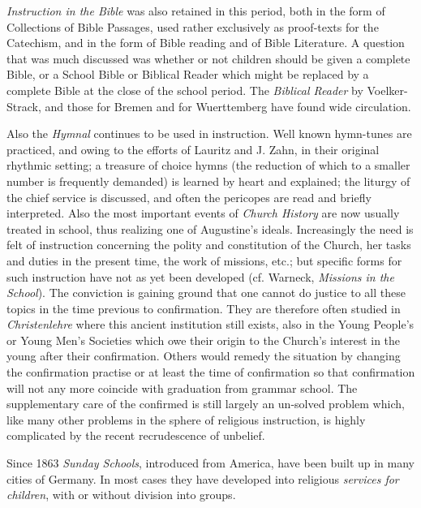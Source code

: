 \emph{Instruction in the Bible} was also retained in this period, both in the form of Collections of Bible Passages, used rather exclusively as proof-texts for the Catechism, and in the form of Bible reading and of Bible Literature. A question that was much discussed was whether or not children should be given a complete Bible, or a School Bible or Biblical Reader
which might be replaced by a complete Bible at the close of the school period. The \emph{Biblical Reader} by Voelker-Strack, and those for Bremen and for Wuerttemberg have found wide circulation.

Also the \emph{Hymnal} continues to be used in instruction. Well known hymn-tunes are practiced, and owing to the efforts of Lauritz and J. Zahn, in their original rhythmic setting; a treasure of choice hymns (the reduction of which to a smaller number is frequently demanded) is learned by heart and explained; the liturgy of the chief service is discussed, and often the pericopes are read and briefly interpreted. Also the most important events of \emph{Church History} are now usually treated in school, thus realizing one of Augustine’s ideals. Increasingly the need is felt of instruction concerning the polity and constitution of the Church, her tasks and duties in the present time, the work of missions, etc.; but specific forms for such instruction have not as yet been developed (cf. Warneck, \emph{Missions in the School}). The conviction is gaining ground that one cannot do justice to all these topics in the time previous to confirmation. They are therefore often studied in \emph{Christenlehre} where this ancient institution still exists, also in the Young People’s or Young Men’s Societies which owe their origin to the Church’s interest in the young after their confirmation. Others would remedy the situation by changing the confirmation practise or at least the time of confirmation so that confirmation will not any more coincide with graduation from grammar school. The supplementary care of the confirmed is still largely an un-solved problem which, like many other problems in the sphere of religious instruction, is highly complicated by the recent recrudescence of unbelief.

Since 1863 \emph{Sunday Schools}, introduced from America, have been built up in many cities of Germany. In most cases
they have developed into religious \emph{services for children}, with or without division into groups.

